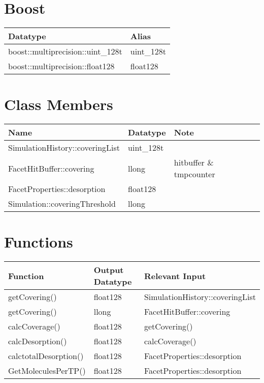 \section{Boost}
\begin{center}
\begin{tabular}{|l|l|}
\hline
Datatype&Alias\\
\hline
boost::multiprecision::uint\_128t&uint\_128t\\
boost::multiprecision::float128&float128\\
\hline
\end{tabular}
\end{center}

\section{Class Members}
\begin{center}
\begin{tabular}{|l|l|l|l|}
\hline
Name&Datatype&Note\\
\hline
SimulationHistory::coveringList&uint\_128t&\\
FacetHitBuffer::covering&llong&hitbuffer \& tmpcounter\\
FacetProperties::desorption&float128&\\
Simulation::coveringThreshold&llong&\\
\hline
\end{tabular}
\end{center}
\section{Functions}
\begin{center}
\begin{tabular}{|l|l|l|}
\hline
Function&Output Datatype&Relevant Input\\
\hline
getCovering()&float128&SimulationHistory::coveringList\\
getCovering()&llong&FacetHitBuffer::covering\\
calcCoverage()&float128&getCovering()\\
calcDesorption()&float128&calcCoverage()\\
calctotalDesorption()&float128&FacetProperties::desorption\\
GetMoleculesPerTP()&float128&FacetProperties::desorption\\
\hline
\end{tabular}
\end{center}

